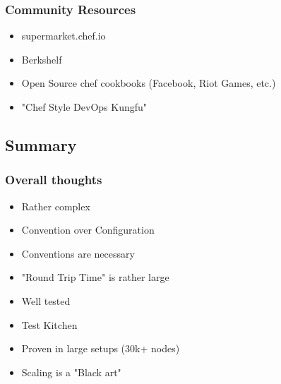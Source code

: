 \frame
{
  \frametitle{Community Resources}

  \begin{itemize}
    \item supermarket.chef.io
    \item Berkshelf
    \item Open Source chef cookbooks (Facebook, Riot Games, etc.)
    \item "Chef Style DevOps Kungfu"
  \end{itemize}
}

\subsection{Summary}
\frame
{
  \frametitle{Overall thoughts}

  \begin{itemize}
    \item<1-> Rather complex
    \item<2-> Convention over Configuration
    \item<3-> Conventions are necessary
    \item<4-> "Round Trip Time" is rather large
    \item<5-> Well tested
    \item<6-> Test Kitchen
    \item<7-> Proven in large setups (30k+ nodes)
    \item<8-> Scaling is a "Black art"
  \end{itemize}
}

